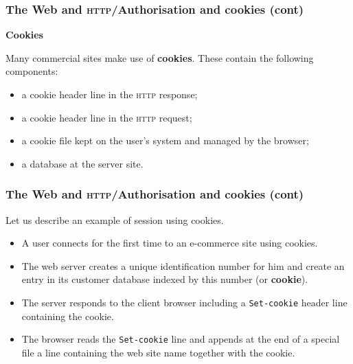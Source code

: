 %
\begin{frame}
\frametitle{The Web and \textsc{http}/Authorisation and cookies (cont)}

\textbf{Cookies}

Many commercial sites make use of \textbf{cookies}. These contain the
following components:
\begin{itemize}

  \item a cookie header line in the \textsc{http} response;

  \item a cookie header line in the \textsc{http} request;

  \item a cookie file kept on the user's system and managed by the
  browser;

  \item a database at the server site.

\end{itemize}

\end{frame}

%
\begin{frame}[containsverbatim]
\frametitle{The Web and \textsc{http}/Authorisation and cookies (cont)}

Let us describe an example of session using cookies.
\begin{itemize}

  \item A user connects for the first time to an e-commerce site using
    cookies. 

  \item The web server creates a unique identification number for
    him and create an entry in its customer database indexed by this
    number (or \textbf{cookie}).

  \item The server responds to the client browser including a
    \verb+Set-cookie+ header line containing the cookie.

  \item The browser reads the \verb+Set-cookie+ line and appends at
    the end of a special file a line containing the web site name
    together with the cookie.

\end{itemize}

\end{frame}

